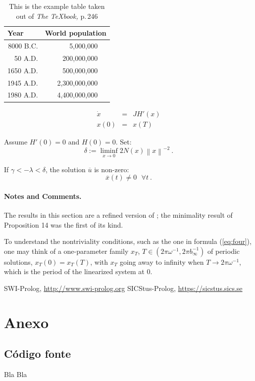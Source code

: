 \documentclass{llncs}
\begin{document}
\begin{table}
\caption{This is the example table taken out of {\it The
\TeX{}book,} p.\,246}
\begin{center}
\begin{tabular}{r@{\quad}rl}
\hline
\multicolumn{1}{l}{\rule{0pt}{12pt}
                   Year}&\multicolumn{2}{l}{World population}\\[2pt]
\hline\rule{0pt}{12pt}
8000 B.C.  &     5,000,000& \\
  50 A.D.  &   200,000,000& \\
1650 A.D.  &   500,000,000& \\
1945 A.D.  & 2,300,000,000& \\
1980 A.D.  & 4,400,000,000& \\[2pt]
\hline
\end{tabular}
\end{center}
\end{table}

\begin{equation}
\begin{array}{rcl}
  \dot{x}&=&JH' (x)\\
  x(0)&=&x (T)
\end{array}
\end{equation}


\begin{proposition}
Assume $H'(0)=0$ and $ H(0)=0$. Set:
\begin{equation}
  \delta := \liminf_{x\to 0} 2 N (x) \left\|x\right\|^{-2}\ .
  \label{eq:one}
\end{equation}

If $\gamma < - \lambda < \delta$,
the solution $\overline{u}$ is non-zero:
\begin{equation}
  \overline{x} (t) \ne 0\ \ \ \forall t\ .
\end{equation}
\end{proposition}


\paragraph{Notes and Comments.}
The results in this section are a
refined version of \cite{clar:eke};
the minimality result of Proposition
14 was the first of its kind.

To understand the nontriviality conditions, such as the one in formula
(\ref{eq:four}), one may think of a one-parameter family
$x_{T}$, $T\in \left(2\pi\omega^{-1}, 2\pi b_{\infty}^{-1}\right)$
of periodic solutions, $x_{T} (0) = x_{T} (T)$,
with $x_{T}$ going away to infinity when $T\to 2\pi \omega^{-1}$,
which is the period of the linearized system at 0.

%
%
\begin{thebibliography}{5}
%
SWI-Prolog,
\url{http://www.swi-prolog.org}
SICStus-Prolog,
\url{https://sicstus.sics.se}


\end{thebibliography}
\clearpage

\section*{Anexo}
\subsection*{Código fonte}

Bla Bla
\end{document}
